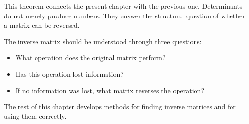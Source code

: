 This theorem connects the present chapter with the previous one. Determinants do not merely produce numbers. They answer the structural question of whether a matrix can be reversed.

\begin{summarybox}
The inverse matrix should be understood through three questions:
\begin{itemize}
\item What operation does the original matrix perform?
\item Has this operation lost information?
\item If no information was lost, what matrix reverses the operation?
\end{itemize}
\end{summarybox}

The rest of this chapter develops methods for finding inverse matrices and for using them correctly.
